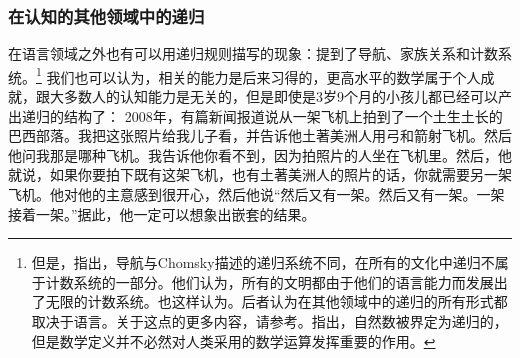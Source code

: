\subsubsection{在认知的其他领域中的递归}

在语言领域之外也有可以用递归规则描写的现象：\citet*[]{HCF2002a}提到了导航、家族关系和计数系统。\footnote{\label{fn-Rekursion-Mathematik}%
但是，\citet[]{PJ2005a}指出，导航与Chomsky描述的递归系统不同，在所有的文化中递归不属于计数系统的一部分。他们认为，所有的文明都由于他们的语言能力而发展出了无限的计数系统。\citet*[]{FHC2005a}也这样认为。后者认为在其他领域中的递归的所有形式都取决于语言。关于这点的更多内容，请参考。\citet{LL2011a}指出，自然数被界定为递归的，但是数学定义并不必然对人类采用的数学运算发挥重要的作用。
}
我们也可以认为，相关的能力是后来习得的，更高水平的数学属于个人成就，跟大多数人的认知能力是无关的，但是即使是3岁9个月的小孩儿都已经可以产出递归的结构了：
2008年，有篇新闻报道说从一架飞机上拍到了一个土生土长的巴西部落。我把这张照片给我儿子看，并告诉他土著美洲人用弓和箭射飞机。然后他问我那是哪种飞机。我告诉他你看不到，因为拍照片的人坐在飞机里。然后，他就说，如果你要拍下既有这架飞机，也有土著美洲人的照片的话，你就需要另一架飞机。他对他的主意感到很开心，然后他说“然后又有一架。然后又有一架。一架接着一架。”据此，他一定可以想象出嵌套的结果。
